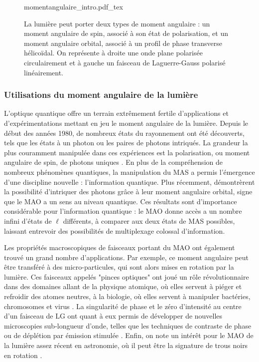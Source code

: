 \begin{figure}[!ht]
\centering
\def\svgwidth{\columnwidth}
{momentangulaire_intro.pdf_tex}
\caption{La lumière peut porter deux types de moment angulaire : un moment angulaire de spin, associé à son état de polarisation, et un moment angulaire orbital, associé à un profil de phase transverse hélicoïdal. On représente à droite une onde plane polarisée circulairement et à gauche un faisceau de Laguerre-Gauss polarisé linéairement.}
\label{Fig:Intro_MA}
\end{figure}

\subsubsection{Utilisations du moment angulaire de la lumière}
L'optique quantique offre un terrain extrêmement fertile d'applications et d'expérimentations mettant en jeu le moment angulaire de la lumière. Depuis le début des années 1980, de nombreux états du rayonnement ont été découverts, tels que les états à un photon ou les paires de photons intriqués. La grandeur la plus couramment manipulée dans ces expériences est la polarisation, ou moment angulaire de spin, de photons uniques . En plus de la compréhension de nombreux phénomènes quantiques, la manipulation du MAS a permis l'émergence d'une discipline nouvelle : l'information quantique. Plus récemment,  démontrèrent la possibilité d'intriquer des photons grâce à leur moment angulaire orbital, signe que le MAO a un sens au niveau quantique. Ces résultats sont d'importance considérable pour l'information quantique  : le MAO donne accès a un nombre infini d'états de $\ell$ différents, à comparer aux deux états de MAS possibles, laissant entrevoir des possibilités de multiplexage colossal d'information.

Les propriétés macroscopiques de faisceaux portant du MAO ont également trouvé un grand nombre d'applications. Par exemple, ce moment angulaire peut être transféré à des micro-particules, qui sont alors mises en rotation par la lumière. Ces faisceaux appelés "pinces optiques" ont joué un rôle révolutionnaire dans des domaines allant de la physique atomique, où elles servent à piéger et refroidir des atomes neutres, à la biologie, où elles servent à manipuler bactéries, chromosomes et virus . La singularité de phase et le zéro d'intensité au centre d'un faisceau de LG ont quant à eux permis de développer de nouvelles microscopies sub-longueur d'onde, telles que les techniques de contraste de phase  ou de déplétion par émission stimulée . Enfin, on note un intérêt pour le MAO de la lumière assez récent en astronomie, où il peut être la signature de trous noirs en rotation .

